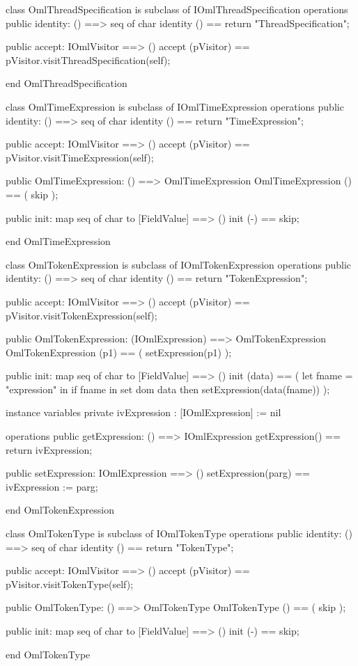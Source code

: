 \begin{vdm_al}
class OmlThreadSpecification is subclass of IOmlThreadSpecification
operations
  public identity: () ==> seq of char
  identity () == return "ThreadSpecification";

  public accept: IOmlVisitor ==> ()
  accept (pVisitor) == pVisitor.visitThreadSpecification(self);

end OmlThreadSpecification
\end{vdm_al}
\begin{vdm_al}
class OmlTimeExpression is subclass of IOmlTimeExpression
operations
  public identity: () ==> seq of char
  identity () == return "TimeExpression";

  public accept: IOmlVisitor ==> ()
  accept (pVisitor) == pVisitor.visitTimeExpression(self);

  public OmlTimeExpression:
      () ==> OmlTimeExpression
  OmlTimeExpression () == 
    ( skip );

  public init: map seq of char to [FieldValue] ==> ()
  init (-) == skip;

end OmlTimeExpression
\end{vdm_al}

\begin{vdm_al}
class OmlTokenExpression is subclass of IOmlTokenExpression
operations
  public identity: () ==> seq of char
  identity () == return "TokenExpression";

  public accept: IOmlVisitor ==> ()
  accept (pVisitor) == pVisitor.visitTokenExpression(self);

  public OmlTokenExpression:
      (IOmlExpression) ==> OmlTokenExpression
  OmlTokenExpression (p1) == 
   ( setExpression(p1) );

  public init: map seq of char to [FieldValue] ==> ()
  init (data) ==
    ( let fname = "expression" in
        if fname in set dom data
        then setExpression(data(fname)) );

instance variables
  private ivExpression : [IOmlExpression] := nil

operations
  public getExpression: () ==> IOmlExpression
  getExpression() == return ivExpression;

  public setExpression: IOmlExpression ==> ()
  setExpression(parg) == ivExpression := parg;

end OmlTokenExpression
\end{vdm_al}

\begin{vdm_al}
class OmlTokenType is subclass of IOmlTokenType
operations
  public identity: () ==> seq of char
  identity () == return "TokenType";

  public accept: IOmlVisitor ==> ()
  accept (pVisitor) == pVisitor.visitTokenType(self);

  public OmlTokenType:
      () ==> OmlTokenType
  OmlTokenType () == 
    ( skip );

  public init: map seq of char to [FieldValue] ==> ()
  init (-) == skip;

end OmlTokenType
\end{vdm_al}

